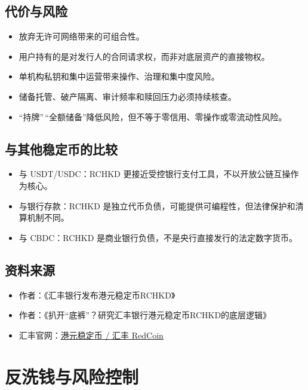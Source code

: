 \section{代价与风险}\label{ux4ee3ux4ef7ux4e0eux98ceux9669}

\begin{itemize}
\tightlist
\item
  放弃无许可网络带来的可组合性。
\item
  用户持有的是对发行人的合同请求权，而非对底层资产的直接物权。
\item
  单机构私钥和集中运营带来操作、治理和集中度风险。
\item
  储备托管、破产隔离、审计频率和赎回压力必须持续核查。
\item
  ``持牌''\,``全额储备''降低风险，但不等于零信用、零操作或零流动性风险。
\end{itemize}

\section{与其他稳定币的比较}\label{ux4e0eux5176ux4ed6ux7a33ux5b9aux5e01ux7684ux6bd4ux8f83}

\begin{itemize}
\tightlist
\item
  与 USDT/USDC：RCHKD 更接近受控银行支付工具，不以开放公链互操作为核心。
\item
  与银行存款：RCHKD 是独立代币负债，可能提供可编程性，但法律保护和清算机制不同。
\item
  与 CBDC：RCHKD 是商业银行负债，不是央行直接发行的法定数字货币。
\end{itemize}

\section{资料来源}\label{ux8d44ux6599ux6765ux6e90}

\begin{itemize}
\tightlist
\item
  作者：《汇丰银行发布港元稳定币RCHKD》
\item
  作者：《扒开``底裤''？研究汇丰银行港元稳定币RCHKD的底层逻辑》
\item
  汇丰官网：\href{https://www.hsbc.com.hk/zh-cn/stablecoins/}{港元稳定币 / 汇丰
  RedCoin}
\end{itemize}

\chapter{反洗钱与风险控制}\label{ux53cdux6d17ux94b1ux4e0eux98ceux9669ux63a7ux5236}

